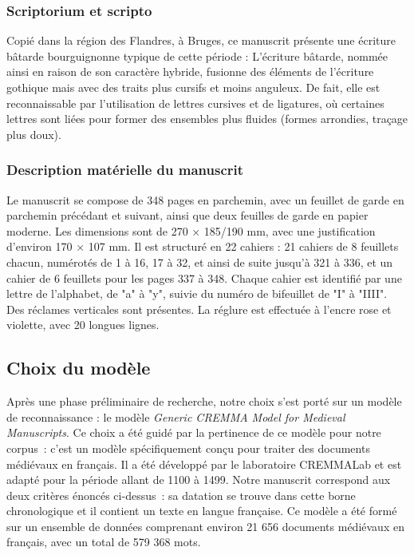 \documentclass[12pt,a4paper,oneside,titlepage]{article} %
\begin{document}
\subsubsection{ Scriptorium et scripto}
Copié dans la région des Flandres, à Bruges, ce manuscrit présente une écriture bâtarde bourguignonne typique de cette période : L'écriture bâtarde, nommée ainsi en raison de son caractère hybride, fusionne des éléments de l'écriture gothique mais avec des traits plus cursifs et moins anguleux. De fait, elle est reconnaissable par l'utilisation de lettres cursives et de ligatures, où certaines lettres sont liées pour former des ensembles plus fluides (formes arrondies, traçage plus doux). 

\subsubsection{Description matérielle du manuscrit}

Le manuscrit se compose de 348 pages en parchemin, avec un feuillet de garde en parchemin précédant et suivant, ainsi que deux feuilles de garde en papier moderne. Les dimensions sont de 270 × 185/190 mm, avec une justification d'environ 170 × 107 mm. Il est structuré en 22 cahiers : 21 cahiers de 8 feuillets chacun, numérotés de 1 à 16, 17 à 32, et ainsi de suite jusqu'à 321 à 336, et un cahier de 6 feuillets pour les pages 337 à 348. Chaque cahier est identifié par une lettre de l'alphabet, de "a" à "y", suivie du numéro de bifeuillet de "I" à "IIII". Des réclames verticales sont présentes. La réglure est effectuée à l'encre rose et violette, avec 20 longues lignes.

\subsection{Choix du modèle}

Après une phase préliminaire de recherche, notre choix s'est porté sur un modèle de reconnaissance : le modèle \emph{Generic CREMMA Model for Medieval Manuscripts}. Ce choix a été guidé par la pertinence de ce modèle pour notre corpus : c’est un modèle spécifiquement conçu pour traiter des documents médiévaux en français. Il a été développé par le laboratoire CREMMALab et est adapté pour la période allant de 1100 à 1499. Notre manuscrit correspond aux deux critères énoncés ci-dessus : sa datation se trouve dans cette borne chronologique et il contient un texte en langue française. Ce modèle a été formé sur un ensemble de données comprenant environ 21 656 documents médiévaux en français, avec un total de 579 368 mots.
\end{document}

